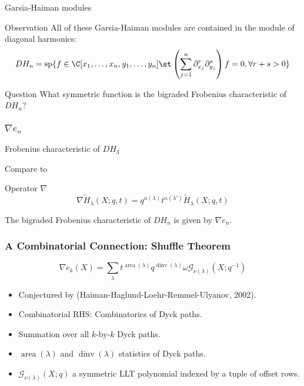 \documentclass{beamer}
\renewcommand{\Span}{\operatorname{sp}}
\DeclareMathOperator{\area}{area}
\DeclareMathOperator{\dinv}{dinv}
\newcommand{\Gcal}{\mathcal{G}}
\newcounter{c}
\begin{document}
  \begin{frame}{Garsia-Haiman modules}
  \begin{block}{Observation}
    All of these Garsia-Haiman modules are contained in the module of
    diagonal harmonics:  \[
      DH_n = \Span\{ f \in \C[x_1,\ldots,x_n,y_1,\ldots,y_n] \st
      \left(\sum_{j=1}^n \partial_{x_j}^r \partial_{y_j}^s\right) f = 0, \forall r+s>0\}
    \]
  \end{block}\pause
  \begin{block}{Question}
    What symmetric function is the bigraded Frobenius characteristic
    of \(DH_n\)?
  \end{block}
\end{frame}
\begin{frame}
  \frametitle{\(\nabla e_n\)}
  Frobenius characteristic of \(DH_3\)\pause
  \begin{center}
    \pause
\end{center}
Compare to
\begin{center}
  \end{center}\pause
  \begin{block}{Operator \(\nabla\)}
    \[
      \nabla \tilde{H}_\lambda(X;q,t) = q^{n(\lambda)} t^{n(\lambda')} \tilde{H}_\lambda(X;q,t)
    \]
  \end{block}\pause
  \begin{theorem}[Haiman, 2002]
    The bigraded Frobenius characteristic of \(DH_n\) is given by \(\nabla e_n\).
  \end{theorem}
\end{frame}
\begin{frame}
  \frametitle{A Combinatorial Connection: Shuffle Theorem}
  \begin{theorem}
    \[
      \nabla e_k(X) = \sum_\lambda t^{\area(\lambda)}q^{\dinv(\lambda)}
      \omega \Gcal_{\nu(\lambda)}(X;q^{-1})
    \]
  \end{theorem}
  \begin{itemize}
  \item Conjectured by (Haiman-Haglund-Loehr-Remmel-Ulyanov, 2002).\pause
  \item Combinatorial RHS: Combinatorics of Dyck paths. \pause
  \item Summation over all \(k\)-by-\(k\) Dyck paths.\pause
  \item \(\area(\lambda)\) and \(\dinv(\lambda)\) statistics of Dyck paths.\pause
  \item \(\Gcal_{\nu(\lambda)}(X;q)\) a symmetric LLT polynomial
    indexed by a tuple of offset rows.
  \end{itemize}
\end{frame}
\end{document}
